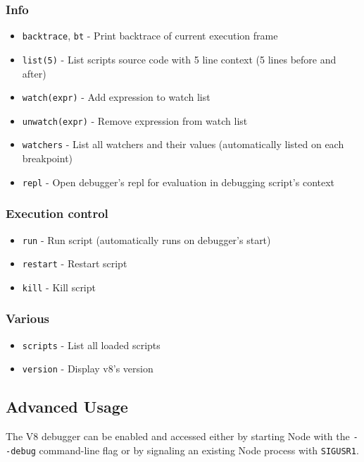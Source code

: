 \subsubsection{Info}

\begin{itemize}
\item
  \texttt{backtrace}, \texttt{bt} - Print backtrace of current execution
  frame
\item
  \texttt{list(5)} - List scripts source code with 5 line context (5
  lines before and after)
\item
  \texttt{watch(expr)} - Add expression to watch list
\item
  \texttt{unwatch(expr)} - Remove expression from watch list
\item
  \texttt{watchers} - List all watchers and their values (automatically
  listed on each breakpoint)
\item
  \texttt{repl} - Open debugger's repl for evaluation in debugging
  script's context
\end{itemize}

\subsubsection{Execution control}

\begin{itemize}
\item
  \texttt{run} - Run script (automatically runs on debugger's start)
\item
  \texttt{restart} - Restart script
\item
  \texttt{kill} - Kill script
\end{itemize}

\subsubsection{Various}

\begin{itemize}
\item
  \texttt{scripts} - List all loaded scripts
\item
  \texttt{version} - Display v8's version
\end{itemize}

\subsection{Advanced Usage}

The V8 debugger can be enabled and accessed either by starting Node with
the \texttt{-{}-debug} command-line flag or by signaling an existing
Node process with \texttt{SIGUSR1}.
